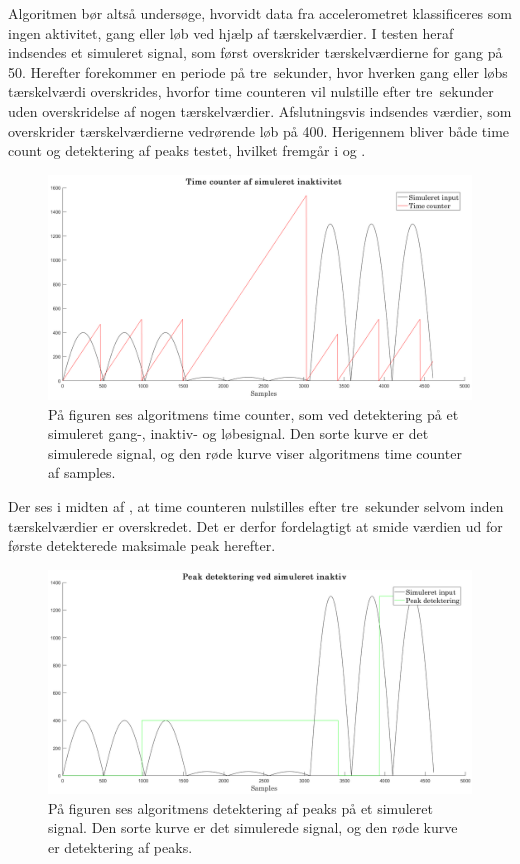 Algoritmen bør altså undersøge, hvorvidt data fra accelerometret klassificeres som ingen aktivitet, gang eller løb ved hjælp af tærskelværdier. I testen heraf indsendes et simuleret signal, som først overskrider tærskelværdierne for gang på 50. Herefter forekommer en periode på tre~sekunder, hvor hverken gang eller løbs tærskelværdi overskrides, hvorfor time counteren vil nulstille efter tre~sekunder uden overskridelse af nogen tærskelværdier. Afslutningsvis indsendes værdier, som overskrider tærskelværdierne vedrørende løb på 400. Herigennem bliver både time count og detektering af peaks testet, hvilket fremgår i  og . 
\begin{figure}[H]
	\centering
	\includegraphics[scale=0.27]{figures/cDesign/test_timecount_inaktiv.png}
	\caption{På figuren ses algoritmens time counter, som ved detektering på et simuleret gang-, inaktiv- og løbesignal. Den sorte kurve er det simulerede signal, og den røde kurve viser algoritmens time counter af samples.}
	\label{fig:test_inaktiv_time}
\end{figure}\vspace{-0.25cm}
Der ses i midten af , at time counteren nulstilles efter tre~sekunder selvom inden tærskelværdier er overskredet. Det er derfor fordelagtigt at smide værdien ud for første detekterede maksimale peak herefter.
\begin{figure}[H]
	\centering
	\includegraphics[width=.7\textwidth]{figures/cDesign/test_peak_inaktiv.png}
	\caption{På figuren ses algoritmens detektering af peaks på et simuleret signal. Den sorte kurve er det simulerede signal, og den røde kurve er detektering af peaks.}
	\label{fig:test_inaktiv_peak}
\end{figure}\vspace{-0.25cm}
